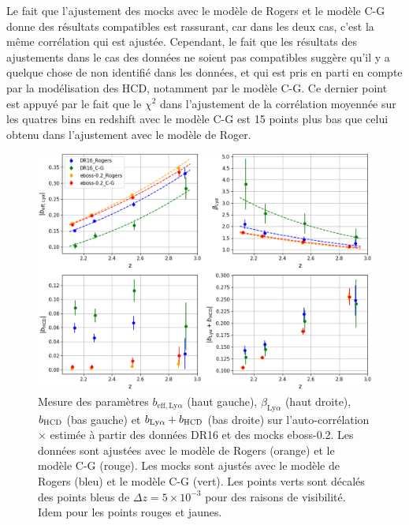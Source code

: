 \documentclass[11pt, twoside, a4paper, openright]{report}
\begin{document}
Le fait que l'ajustement des mocks avec le modèle de Rogers et le modèle C-G donne des résultats compatibles est rassurant, car dans les deux cas, c'est la même corrélation qui est ajustée. Cependant, le fait que les résultats des ajustements dans le cas des données ne soient pas compatibles suggère qu'il y a quelque chose de non identifié dans les données, et qui est pris en parti en compte par la modélisation des HCD, notamment par le modèle C-G. Ce dernier point est appuyé par le fait que le $\chi^2$ dans l'ajustement de la corrélation moyennée sur les quatres bins en redshift avec le modèle C-G est 15 points plus bas que celui obtenu dans l'ajustement avec le modèle de Roger.

\begin{figure}
  \centering
  \includegraphics[scale=0.44]{bias_CG_mask}
  \caption{Mesure des paramètres $b_{\mathrm{eff},\mathrm{Ly}\alpha}$ (haut gauche), $\beta_{\mathrm{Ly}\alpha}$ (haut droite), $b_{\textsc{HCD}}$ (bas gauche) et $b_{\mathrm{Ly}\alpha} + b_{\textsc{HCD}}$ (bas droite) sur l'auto-corrélation \lya$\times$\lya{} estimée à partir des données DR16 et des mocks eboss-0.2. Les données sont ajustées avec le modèle de Rogers (orange) et le modèle C-G (rouge). Les mocks sont ajustés avec le modèle de Rogers (bleu) et le modèle C-G (vert). Les points verts sont décalés des points bleus de $\Delta z = 5\times10^{-3}$ pour des raisons de visibilité. Idem pour les points rouges et jaunes.}
  \label{fig:bias_CG_mask}
\end{figure}
\end{document}

